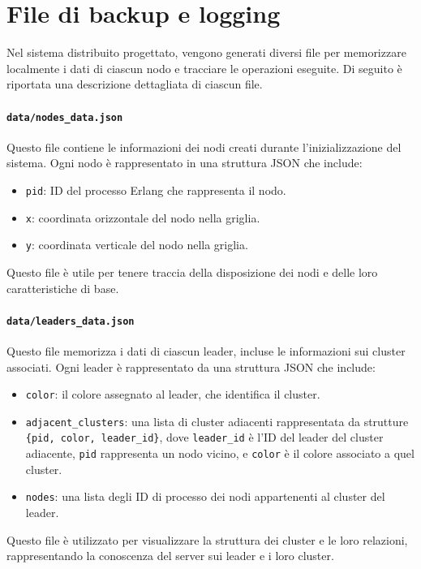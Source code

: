 \documentclass[12pt, a4paper]{report}
\begin{document}
\section{File di backup e logging}

Nel sistema distribuito progettato, vengono generati diversi file per memorizzare localmente i dati di ciascun nodo e tracciare le operazioni eseguite. Di seguito è riportata una descrizione dettagliata di ciascun file.

\paragraph{\texttt{data/nodes\_data.json}} Questo file contiene le informazioni dei nodi creati durante l'inizializzazione del sistema. Ogni nodo è rappresentato in una struttura JSON che include:
\begin{itemize}
    \item \texttt{pid}: ID del processo Erlang che rappresenta il nodo.
    \item \texttt{x}: coordinata orizzontale del nodo nella griglia.
    \item \texttt{y}: coordinata verticale del nodo nella griglia.
\end{itemize}
Questo file è utile per tenere traccia della disposizione dei nodi e delle loro caratteristiche di base.

\paragraph{\texttt{data/leaders\_data.json}} Questo file memorizza i dati di ciascun leader, incluse le informazioni sui cluster associati. Ogni leader è rappresentato da una struttura JSON che include:
\begin{itemize}
    \item \texttt{color}: il colore assegnato al leader, che identifica il cluster.
    \item \texttt{adjacent\_clusters}: una lista di cluster adiacenti rappresentata da strutture \texttt{\{pid, color, leader\_id\}}, dove \texttt{leader\_id} è l'ID del leader del cluster adiacente, \texttt{pid} rappresenta un nodo vicino, e \texttt{color} è il colore associato a quel cluster.
    \item \texttt{nodes}: una lista degli ID di processo dei nodi appartenenti al cluster del leader.
\end{itemize}
Questo file è utilizzato per visualizzare la struttura dei cluster e le loro relazioni, rappresentando la conoscenza del server sui leader e i loro cluster.
\end{document}
